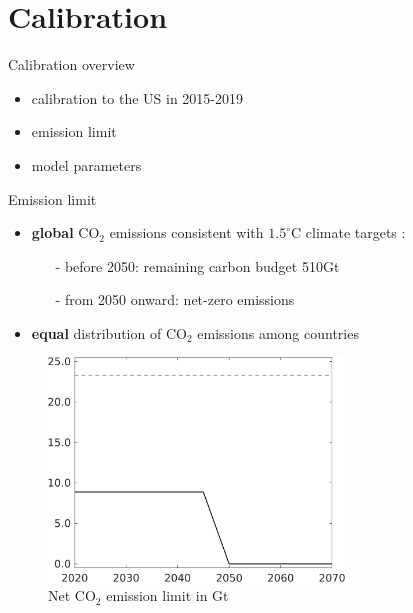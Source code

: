 \documentclass[11pt,aspectratio=169]{beamer}
\begin{document}
\hypertarget{calback}{}
\section{Calibration}
\begin{frame}{Calibration overview}
	\begin{itemize}
		\item
		calibration to the US in 2015-2019
		\item emission limit
		\item model parameters
	\end{itemize}
\end{frame}

\begin{frame}{Emission limit}
	\vspace{-1mm}
	\begin{itemize}
		\item<+->  \textbf{global} CO$_2$ emissions consistent with $1.5^\circ$C climate targets \footnotesize{\citep{IPCC2022}}\normalsize:
		\vspace{1mm}
		\begin{itemize}
			\item[-] before 2050: remaining carbon budget 510Gt
			\item[-] from 2050 onward: net-zero  emissions
		\end{itemize}
		\vspace{0mm}
		\item<+-> \textbf{equal} distribution of  CO$_2$ emissions among countries %
	\end{itemize}
	\vspace{-2mm}
	\pause
	\begin{center}
		\begin{minipage}{0.6\textwidth}
			\begin{figure}
				\caption{Net CO$_2$ emission limit in Gt}
				\includegraphics[width=0.7\textwidth]{../codding_model/own_basedOnFried/optimalPol_010922_revision/figures/all_13Sept22_Tplus30/Emnet_goals_o0_lgd0.png}

\end{figure}
\end{minipage}
\end{center}
\end{frame}
\end{document}
